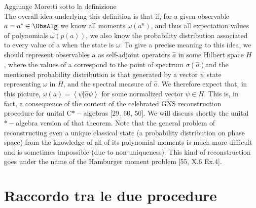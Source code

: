 \documentclass[Main]{subfiles}
\begin{document}
				\begin{Warning}
					Aggiunge Moretti sotto la definizione\\
						
				 	The overall idea underlying this definition is that if, for a given observable $a = a^* \in \ObsAlg$ we know all moments $\omega( a^n )$, and thus all expectation values of polynomials $\omega\left(p(a)\right)$, we also know the probability distribution associated to every value of a when the state is $\omega$. 
				 	To give a precise meaning to this idea, we should represent observables a as self-adjoint operators $\hat{a}$ in some Hilbert space $H$, where the values of a correspond to the point of spectrum $\sigma(\hat{a})$and the mentioned probability distribution is that generated by a vector $\psi$  state representing $\omega$ in $H$, and the spectral measure of $\hat{a}$. 
				 	We therefore expect that, in this picture, $\omega(a) = \left\langle  \psi \vert \hat{a} \psi \right\rangle$ for some normalized vector $\psi \in H$. 
				 	This is, in fact, a consequence of the content of the celebrated GNS reconstruction procedure for unital C$\ast-$algebras [29, 60, 50].
				 	We will discuss shortly the unital  $\ast-$algebra version of that theorem. 
				 	Note that the general problem of reconstructing even a unique classical state (a probability distribution on phase space) from the knowledge of all of its polynomial moments is much more difficult and is sometimes impossible (due to non-uniqueness). 
				 	This kind of reconstruction goes under the name of the Hamburger moment problem [55, X.6 Ex.4].
				\end{Warning}					
			
\section{Raccordo tra le due procedure}
\end{document}
